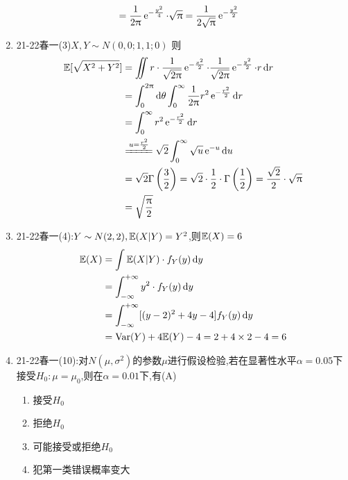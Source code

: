 \documentclass{article}
\begin{document}
\begin{enumerate}[label=(\arabic*)]
\[\begin{aligned}
					&= \frac{1}{2\uppi}\operatorname{e}^{-\frac{y^2}{4}}\cdot \sqrt{\uppi} = \frac{1}{2\sqrt{\uppi}}\operatorname{e}^{-\frac{y^2}{2}}
				\end{aligned}\]
	\item 21-22春一(3)$X,Y\sim N(0,0;1,1;0)$
				则\[\begin{split}
					\E[\sqrt{X^2+Y^2}]&=\iint r\cdot \frac{1}{\sqrt{2\uppi}}\e^{-\frac{x^2}{2}}\cdot \frac{1}{\sqrt{2\uppi}}\e^{-\frac{y^2}{2}}\cdot r\dif r\\
					&= \int_{0}^{2\uppi}\dif \theta \int_{0}^{\infty}\frac{1}{2\uppi}r^2 \e^{-\frac{r^2}{2}}\dif r\\
					&= \int_{0}^{\infty}r^2\e^{-\frac{r^2}{2}}\dif r\\
					&\xlongequal{u=\frac{r^2}{2}}\sqrt{2}\int_{0}^{\infty}\sqrt{u}\e^{-u}\dif u\\
					&= \sqrt{2}\Gamma \left(\frac{3}{2}\right) = \sqrt{2}\cdot \frac{1}{2}\cdot \Gamma \left(\frac{1}{2}\right) = \frac{\sqrt{2}}{2}\cdot \sqrt{\uppi}\\
					&= \sqrt{\frac{\uppi}{2}}
				\end{split}\]
	\item 21-22春一(4):$Y\sim N(2,2),\mathbb{E}(X|Y)=Y^2$,则$\mathbb{E}(X)=6$
				\[\begin{split}
					\mathbb{E}(X) &= \int \mathbb{E}(X|Y)\cdot f_Y(y)\mathop{}\!\mathrm{d} y\\
					&= \int_{-\infty}^{+\infty}y^2\cdot f_Y(y)\mathop{}\!\mathrm{d} y\\
					&= \int_{-\infty}^{+\infty}[(y-2)^2+4y-4]f_{Y}(y)\mathop{}\!\mathrm{d} y\\
					&= \mathrm{Var}(Y)+4\mathbb{E}(Y)-4=2+4\times 2-4=6
				\end{split}\]
	\item 21-22春一(10):对$N(\mu,\sigma^2)$的参数$\mu$进行假设检验,若在显著性水平$\alpha=0.05$下接受$H_0:\mu=\mu_0$,则在$\alpha=0.01$下,有(A)
				\begin{enumerate}[label=(\Alph*)]
					\item 接受$H_0$
					\item 拒绝$H_0$
					\item 可能接受或拒绝$H_0$
					\item 犯第一类错误概率变大
				\end{enumerate}
\end{enumerate}
\end{document}
